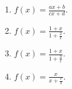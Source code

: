 \begin{multicols}{2}
\begin{enumerate}[ref={\fcProblemRef}]
\item $\displaystyle f(x)=\frac{a x+b}{c x+ d}$.

\item $\displaystyle f(x)=\frac{1+x }{1+\frac{2}x}$. 

\item $\displaystyle f(x)=\frac{1+x }{1+\frac{3}x}$. 

\item $\displaystyle f(x)=\frac{x}{x+\frac{c}{x}}$.

\end{enumerate}
\end{multicols}
